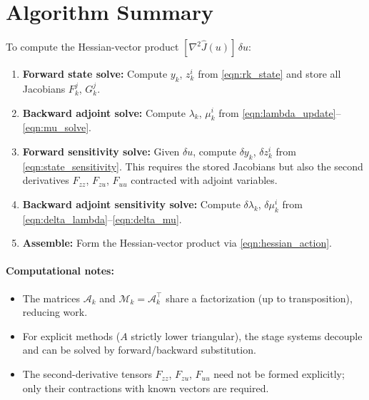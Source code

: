 \documentclass[11pt]{article}
\newcommand{\tp}{^\top}
\begin{document}
\section{Algorithm Summary}

To compute the Hessian-vector product $[\nabla^2\hat{J}(u)]\,\delta u$:

\begin{enumerate}
\item \textbf{Forward state solve:} Compute $y_k$, $z_k^i$ from \eqref{eqn:rk_state} and store all Jacobians $F_k^j$, $G_k^j$.

\item \textbf{Backward adjoint solve:} Compute $\lambda_k$, $\mu_k^i$ from \eqref{eqn:lambda_update}--\eqref{eqn:mu_solve}.

\item \textbf{Forward sensitivity solve:} Given $\delta u$, compute $\delta y_k$, $\delta z_k^i$ from \eqref{eqn:state_sensitivity}. This requires the stored Jacobians but also the second derivatives $F_{zz}$, $F_{zu}$, $F_{uu}$ contracted with adjoint variables.

\item \textbf{Backward adjoint sensitivity solve:} Compute $\delta\lambda_k$, $\delta\mu_k^i$ from \eqref{eqn:delta_lambda}--\eqref{eqn:delta_mu}.

\item \textbf{Assemble:} Form the Hessian-vector product via \eqref{eqn:hessian_action}.
\end{enumerate}

\paragraph{Computational notes:}
\begin{itemize}
\item The matrices $\mathcal{A}_k$ and $\mathcal{M}_k = \mathcal{A}_k\tp$ share a factorization (up to transposition), reducing work.
\item For explicit methods ($A$ strictly lower triangular), the stage systems decouple and can be solved by forward/backward substitution.
\item The second-derivative tensors $F_{zz}$, $F_{zu}$, $F_{uu}$ need not be formed explicitly; only their contractions with known vectors are required.
\end{itemize}
\end{document}
